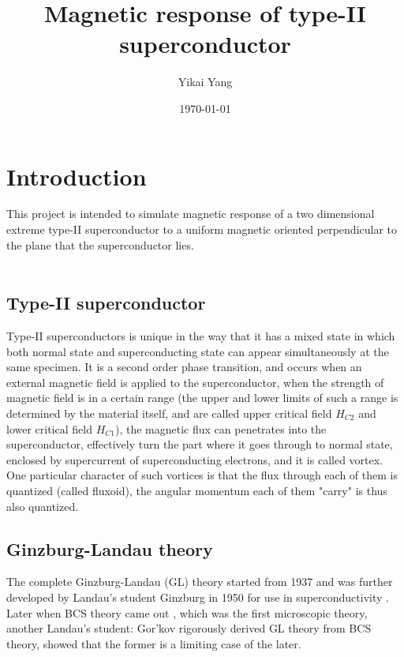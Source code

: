 \documentclass[11pt]{article}
\begin{document}
\title{Magnetic response of type-II superconductor}
\author{Yikai Yang}
\date{\today}
\maketitle

\section{Introduction}

This project is intended to simulate magnetic response of a two dimensional extreme type-II superconductor to a uniform magnetic oriented perpendicular to the plane that the superconductor lies.\\
\\
\subsection{Type-II superconductor}
Type-II superconductors is unique in the way that it has a mixed state in which both normal state and superconducting state can appear simultaneously at the same specimen. It is a second order phase transition, and occurs when an external magnetic field is applied to the superconductor, when the strength of magnetic field is in a certain range (the upper and lower limits of such a range is determined by the material itself, and are called upper critical field $H_{C2}$ and lower critical field $H_{C1}$), the magnetic flux can penetrates into the superconductor, effectively turn the part where it goes through to normal state, enclosed by supercurrent of superconducting electrons, and it is called vortex. One particular character of such vortices is that the flux through each of them is quantized (called fluxoid), the angular momentum each of them "carry" is thus also quantized.


\subsection{Ginzburg-Landau theory}
 The complete Ginzburg-Landau (GL) theory started from 1937 and was further developed by Landau's student Ginzburg in 1950 for use in superconductivity \cite{GLa}. Later when BCS theory came out \cite{BCS}, which was the first microscopic theory, another Landau's student: Gor'kov rigorously derived GL theory from BCS theory, showed that the former is a limiting case of the later\cite{Gorkov}.\\
\\
\end{document}

